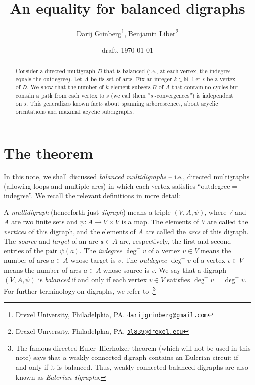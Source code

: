 \documentclass[numbers=enddot,12pt,final,onecolumn,notitlepage]{scrartcl}%
\theoremstyle{definition}
\theoremstyle{plainsl}
\begin{document}
\title{An equality for balanced digraphs}
\author{Darij Grinberg\thanks{Drexel University, Philadelphia, PA.
\href{mailto:darijgrinberg@gmail.com}{\texttt{darijgrinberg@gmail.com}}},
Benjamin Liber\thanks{Drexel University, Philadelphia, PA.
\href{mailto:bl839@drexel.edu}{\texttt{bl839@drexel.edu}}}}
\date{draft, \today}
\maketitle

\begin{abstract}
Consider a directed multigraph $D$ that is balanced (i.e., at each vertex, the
indegree equals the outdegree). Let $A$ be its set of arcs. Fix an integer
$k\in\mathbb{N}$. Let $s$ be a vertex of $D$. We show that the number of
$k$-element subsets $B$ of $A$ that contain no cycles but contain a path from
each vertex to $s$ (we call them \textquotedblleft$s$%
-convergences\textquotedblright) is independent on $s$. This generalizes known
facts about spanning arborescences, about acyclic orientations and maximal
acyclic subdigraphs.

\end{abstract}

\section{The theorem}

In this note, we shall discussed \emph{balanced multidigraphs} -- i.e.,
directed multigraphs (allowing loops and multiple arcs) in which each vertex
satisfies \textquotedblleft outdegree = indegree\textquotedblright. We recall
the relevant definitions in more detail:

A \emph{multidigraph} (henceforth just \emph{digraph}) means a triple
$(V,A,\psi)$, where $V$ and $A$ are two finite sets and $\psi: A \to V \times
V$ is a map. The elements of $V$ are called the \emph{vertices} of this
digraph, and the elements of $A$ are called the \emph{arcs} of this digraph.
The \emph{source} and \emph{target} of an arc $a \in A$ are, respectively, the
first and second entries of the pair $\psi(a)$. The \emph{indegree} $\deg
^{-}v$ of a vertex $v \in V$ means the number of arcs $a \in A$ whose target
is $v$. The \emph{outdegree} $\deg^{+}v$ of a vertex $v \in V$ means the
number of arcs $a \in A$ whose source is $v$. We say that a digraph
$(V,A,\psi)$ is \emph{balanced} if and only if each vertex $v \in V$ satisfies
$\deg^{+}v = \deg^{-}v$. For further terminology on digraphs, we refer to
\cite{22s}.\footnote{The famous directed Euler--Hierholzer theorem (which will
not be used in this note) says that a weakly connected digraph contains an
Eulerian circuit if and only if it is balanced. Thus, weakly connected
balanced digraphs are also known as \emph{Eulerian digraphs}.}
\end{document}
